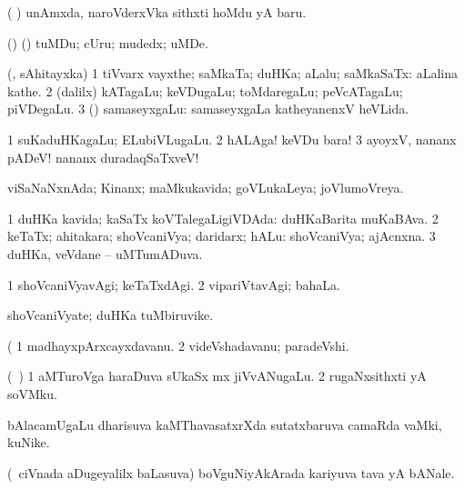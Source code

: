 \noindent
\gl{\pagu}
\expl{}
\bmng
{} ( \ashi) unAmxda, naroVderxVka sithxti hoMdu yA baru. 
\emng
\eentry

\bentry
{} 
\gl{\nA}
\expl{}
\bmng
(\birx) (\AmA) tuMDu; cUru; mudedx; uMDe. 
\emng
\eentry

\bentry
{} 
\gl{\nA}
\expl{}
\bmng
(\pArxparx, sAhitayxka) 
\bnum
\num{1} tiVvarx vayxthe; saMkaTa; duHKa; aLalu; saMkaSaTx:  aLalina kathe. 
\num{2} (\bava dalilx) kATagaLu; keVDugaLu; toMdaregaLu; peVcATagaLu; piVDegaLu. 
\num{3} (\hA) samaseyxgaLu:  samaseyxgaLa katheyanenxV heVLida. 
\enum
\emng

\noindent
\gl{\pagu}
\expl{}
\bmng
\bnum
\num{1}  suKaduHKagaLu; ELubiVLugaLu. 
\num{2}  hALAga! keVDu bara! 
\num{3}  ayoyxV, nananx pADeV! nananx duradaqSaTxveV! 
\enum
\emng
\eentry

\bentry
{} 
\gl{\gu}
\expl{}
\bmng
viSaNaNxnAda; Kinanx; maMkukavida; goVLukaLeya; joVlumoVreya. 
\emng
\eentry

\bentry
{} 
\gl{\gu}
\expl{}
\bmng
\bnum
\num{1} duHKa kavida; kaSaTx koVTalegaLigiVDAda:  duHKaBarita muKaBAva. 
\num{2} keTaTx; ahitakara; shoVcaniVya; daridarx; hALu:  shoVcaniVya; ajAcnxna. 
\num{3} duHKa, veVdane -- uMTumADuva. 
\enum
\emng
\eentry

\bentry
{} 
\gl{\kirxvi}
\expl{}
\bmng
\bnum
\num{1} shoVcaniVyavAgi; keTaTxdAgi. 
\num{2} vipariVtavAgi; bahaLa. 
\enum
\emng
\eentry

\bentry
{} 
\gl{\nA}
\expl{}
\bmng
shoVcaniVyate; duHKa tuMbiruvike. 
\emng
\eentry

\bentry
{} 
\gl{\nA}
\expl{}
\gl{\ashi}
\bmng
( 
\bnum
\num{1} madhayxpArxcayxdavanu. 
\num{2} videVshadavanu; paradeVshi. 
\enum
\emng
\eentry

\bentry
{} 
\gl{\nA}
\expl{}
\bmng
(\AseTxrXV\ \ashi) 
\bnum
\num{1} aMTuroVga haraDuva sUkaSx mx jiVvANugaLu. 
\num{2} rugaNxsithxti yA soVMku. 
\enum
\emng
\eentry

\bentry
{} 
\gl{\nA}
\expl{}
\bmng
bAlacamUgaLu dharisuva kaMThavasatxrXda sutatxbaruva camaRda vaMki, kuNike. 
\emng
\eentry

\bentry
{} 
\gl{\nA}
\expl{}
\bmng
(\kanmu\ ciVnada aDugeyalilx baLasuva) boVguNiyAkArada kariyuva tava yA bANale. 
\emng
\eentry

